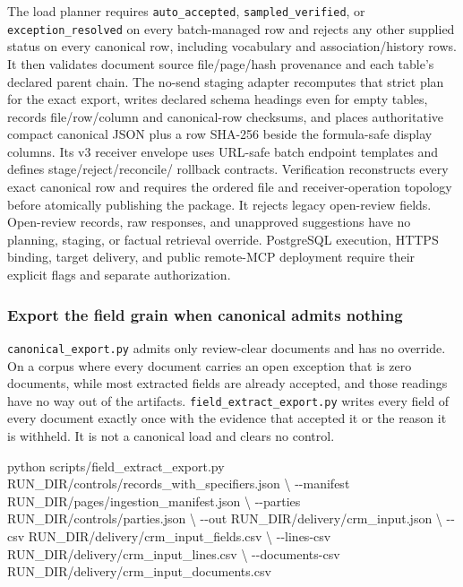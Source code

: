 \documentclass[
]{article}
\newenvironment{Shaded}{}{}
\newcommand{\AttributeTok}[1]{\textcolor[rgb]{0.49,0.56,0.16}{#1}}
\newcommand{\DataTypeTok}[1]{\textcolor[rgb]{0.56,0.13,0.00}{#1}}
\newcommand{\ExtensionTok}[1]{#1}
\newcommand{\NormalTok}[1]{#1}
\begin{document}
The load planner requires \texttt{auto\_\allowbreak{}accepted},
\texttt{sampled\_\allowbreak{}verified}, or
\texttt{exception\_\allowbreak{}resolved} on every batch-managed row and
rejects any other supplied status on every canonical row, including
vocabulary and association/history rows. It then validates document
source file/page/hash provenance and each table's declared parent chain.
The no-send staging adapter recomputes that strict plan for the exact
export, writes declared schema headings even for empty tables, records
file/row/column and canonical-row checksums, and places authoritative
compact canonical JSON plus a row SHA-256 beside the formula-safe
display columns. Its v3 receiver envelope uses URL-safe batch endpoint
templates and defines stage/reject/reconcile/ rollback contracts.
Verification reconstructs every exact canonical row and requires the
ordered file and receiver-operation topology before atomically
publishing the package. It rejects legacy open-review fields.
Open-review records, raw responses, and unapproved suggestions have no
planning, staging, or factual retrieval override. PostgreSQL execution,
HTTPS binding, target delivery, and public remote-MCP deployment require
their explicit flags and separate authorization.

\subsubsection{Export the field grain when canonical admits
nothing}\label{export-the-field-grain-when-canonical-admits-nothing}

\texttt{canonical\_\allowbreak{}export.py} admits only review-clear
documents and has no override. On a corpus where every document carries
an open exception that is zero documents, while most extracted fields
are already accepted, and those readings have no way out of the
artifacts. \texttt{field\_\allowbreak{}extract\_\allowbreak{}export.py}
writes every field of every document exactly once with the evidence that
accepted it or the reason it is withheld. It is not a canonical load and
clears no control.

\begin{Shaded}
\begin{Highlighting}[]
\ExtensionTok{python}\NormalTok{ scripts/field\_extract\_export.py RUN\_DIR/controls/records\_with\_specifiers.json }\DataTypeTok{\textbackslash{}}
  \AttributeTok{{-}{-}manifest}\NormalTok{ RUN\_DIR/pages/ingestion\_manifest.json }\DataTypeTok{\textbackslash{}}
  \AttributeTok{{-}{-}parties}\NormalTok{ RUN\_DIR/controls/parties.json }\DataTypeTok{\textbackslash{}}
  \AttributeTok{{-}{-}out}\NormalTok{ RUN\_DIR/delivery/crm\_input.json }\DataTypeTok{\textbackslash{}}
  \AttributeTok{{-}{-}csv}\NormalTok{ RUN\_DIR/delivery/crm\_input\_fields.csv }\DataTypeTok{\textbackslash{}}
  \AttributeTok{{-}{-}lines{-}csv}\NormalTok{ RUN\_DIR/delivery/crm\_input\_lines.csv }\DataTypeTok{\textbackslash{}}
  \AttributeTok{{-}{-}documents{-}csv}\NormalTok{ RUN\_DIR/delivery/crm\_input\_documents.csv}
\end{Highlighting}
\end{Shaded}
\end{document}
